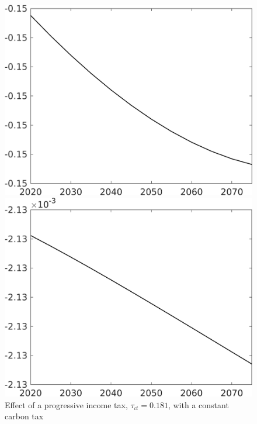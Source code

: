  \begin{figure}[h!!]
 	\centering
 	\caption{Effect of a progressive income tax, $\tau_{\iota t}=0.181$, with a constant carbon tax}		\label{fig:Efftaul_nsk0_xgr0_know}		
 	\begin{minipage}[]{0.32\textwidth}
 		\includegraphics[width=1\textwidth]{../../codding_model/own_basedOnFried/optimalPol_010922_revision/figures/all_13Sept22/CompTaufPER_bytaul_Reg0_GFF_spillover0_nsk0_xgr0_knspil0_sep0_LFlimit0_emsbase0_countec0_GovRev0_etaa0.79_lgd0.png}
 	\end{minipage}
 	\begin{minipage}[]{0.32\textwidth}
 		\includegraphics[width=1\textwidth]{../../codding_model/own_basedOnFried/optimalPol_010922_revision/figures/all_13Sept22/CompTaufPER_bytaul_Reg0_EY_spillover0_nsk0_xgr0_knspil0_sep0_LFlimit0_emsbase0_countec0_GovRev0_etaa0.79_lgd0.png}

\end{minipage}
\end{figure}

